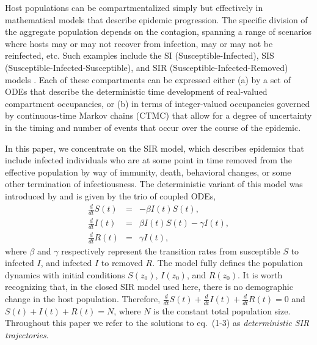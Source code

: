 \documentclass[12pt,titlepage]{article}
\newcommand{\ajd}[1]{{\color{black} #1}}
\begin{document}
Host populations can be compartmentalized simply but effectively in 
mathematical models that describe epidemic progression.  The specific division of the 
aggregate population depends on the contagion, spanning a range 
of scenarios where hosts may or may not recover from infection, may or may not be reinfected, etc.  
Such examples include the SI (Susceptible-Infected), 
SIS (Susceptible-Infected-Susceptible), and SIR (Susceptible-Infected-Removed) models \citep{Anderson:1991fk, Keeling:2008zr}.
Each of these compartments can be expressed either
(a) by a set of ODEs that describe the deterministic
time development of real-valued compartment occupancies, or (b) in terms of integer-valued
occupancies governed by continuous-time Markov chains (CTMC) that allow for a degree of
uncertainty in the timing and number of events that occur over the course of the epidemic.


In this paper, we concentrate on the SIR model, which describes epidemics that 
include infected individuals who are at some point in time removed from the effective 
population by way of immunity, death, behavioral changes, or some other termination of infectiousness.  
The deterministic variant of this model was introduced by \cite{KermackandMcKendrick} and is given by the trio of coupled
ODEs,
\begin{eqnarray}
\frac{d}{dt} S(t) &=& - \beta I(t)S(t),\label{eq:SIR1}\\
\frac{d}{dt} I(t) &=& \beta I(t)S(t) - \gamma I(t),\label{eq:SIR2}\\
\frac{d}{dt} R(t) &=& \gamma I(t),\label{eq:SIR3}
\end{eqnarray}
where $\beta$ and $\gamma$ respectively represent the transition rates
from susceptible $S$ to infected $I$, and infected $I$ to removed
$R$. 
\ajd{The model fully defines the population dynamics with initial conditions $S(z_{0})$, $I(z_{0})$, and $R(z_{0})$.  It is worth recognizing that, in the closed SIR model used here, 
there is no demographic change in the host population. Therefore, $\frac{d}{dt} S(t)+\frac{d}{dt} I(t)+\frac{d}{dt} R(t)=0$ 
and $S(t)+I(t)+R(t)=N$, where $N$ is the constant total population size.}
 Throughout this paper we refer to the solutions to eq.~(1-3) as \emph{deterministic SIR trajectories}.
\end{document}

